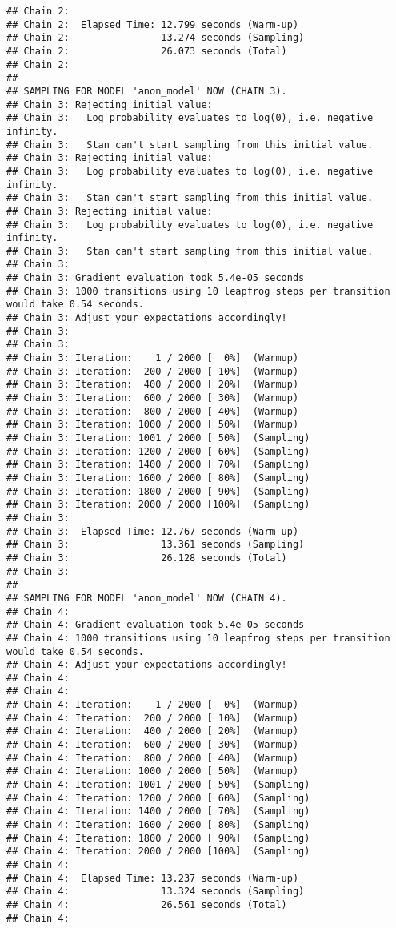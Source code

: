 \documentclass[
]{article}
\begin{document}
\begin{verbatim}
## Chain 2: 
## Chain 2:  Elapsed Time: 12.799 seconds (Warm-up)
## Chain 2:                13.274 seconds (Sampling)
## Chain 2:                26.073 seconds (Total)
## Chain 2: 
## 
## SAMPLING FOR MODEL 'anon_model' NOW (CHAIN 3).
## Chain 3: Rejecting initial value:
## Chain 3:   Log probability evaluates to log(0), i.e. negative infinity.
## Chain 3:   Stan can't start sampling from this initial value.
## Chain 3: Rejecting initial value:
## Chain 3:   Log probability evaluates to log(0), i.e. negative infinity.
## Chain 3:   Stan can't start sampling from this initial value.
## Chain 3: Rejecting initial value:
## Chain 3:   Log probability evaluates to log(0), i.e. negative infinity.
## Chain 3:   Stan can't start sampling from this initial value.
## Chain 3: 
## Chain 3: Gradient evaluation took 5.4e-05 seconds
## Chain 3: 1000 transitions using 10 leapfrog steps per transition would take 0.54 seconds.
## Chain 3: Adjust your expectations accordingly!
## Chain 3: 
## Chain 3: 
## Chain 3: Iteration:    1 / 2000 [  0%]  (Warmup)
## Chain 3: Iteration:  200 / 2000 [ 10%]  (Warmup)
## Chain 3: Iteration:  400 / 2000 [ 20%]  (Warmup)
## Chain 3: Iteration:  600 / 2000 [ 30%]  (Warmup)
## Chain 3: Iteration:  800 / 2000 [ 40%]  (Warmup)
## Chain 3: Iteration: 1000 / 2000 [ 50%]  (Warmup)
## Chain 3: Iteration: 1001 / 2000 [ 50%]  (Sampling)
## Chain 3: Iteration: 1200 / 2000 [ 60%]  (Sampling)
## Chain 3: Iteration: 1400 / 2000 [ 70%]  (Sampling)
## Chain 3: Iteration: 1600 / 2000 [ 80%]  (Sampling)
## Chain 3: Iteration: 1800 / 2000 [ 90%]  (Sampling)
## Chain 3: Iteration: 2000 / 2000 [100%]  (Sampling)
## Chain 3: 
## Chain 3:  Elapsed Time: 12.767 seconds (Warm-up)
## Chain 3:                13.361 seconds (Sampling)
## Chain 3:                26.128 seconds (Total)
## Chain 3: 
## 
## SAMPLING FOR MODEL 'anon_model' NOW (CHAIN 4).
## Chain 4: 
## Chain 4: Gradient evaluation took 5.4e-05 seconds
## Chain 4: 1000 transitions using 10 leapfrog steps per transition would take 0.54 seconds.
## Chain 4: Adjust your expectations accordingly!
## Chain 4: 
## Chain 4: 
## Chain 4: Iteration:    1 / 2000 [  0%]  (Warmup)
## Chain 4: Iteration:  200 / 2000 [ 10%]  (Warmup)
## Chain 4: Iteration:  400 / 2000 [ 20%]  (Warmup)
## Chain 4: Iteration:  600 / 2000 [ 30%]  (Warmup)
## Chain 4: Iteration:  800 / 2000 [ 40%]  (Warmup)
## Chain 4: Iteration: 1000 / 2000 [ 50%]  (Warmup)
## Chain 4: Iteration: 1001 / 2000 [ 50%]  (Sampling)
## Chain 4: Iteration: 1200 / 2000 [ 60%]  (Sampling)
## Chain 4: Iteration: 1400 / 2000 [ 70%]  (Sampling)
## Chain 4: Iteration: 1600 / 2000 [ 80%]  (Sampling)
## Chain 4: Iteration: 1800 / 2000 [ 90%]  (Sampling)
## Chain 4: Iteration: 2000 / 2000 [100%]  (Sampling)
## Chain 4: 
## Chain 4:  Elapsed Time: 13.237 seconds (Warm-up)
## Chain 4:                13.324 seconds (Sampling)
## Chain 4:                26.561 seconds (Total)
## Chain 4:
\end{verbatim}
\end{document}
